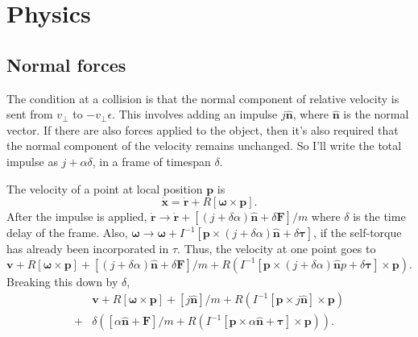 \documentclass[11pt,twocolumn]{article}
\newcommand{\unit}[1]{\hat{\bm {#1}}}
\newcommand{\parens}[1]{\left(#1\right)}
\begin{document}
    \section{Physics}

    \subsection{Normal forces}
    The condition at a collision is that the normal component of relative velocity is sent from $v_\perp$ to $-v_\perp \epsilon$. This involves adding an impulse $j \unit n$, where $\unit n$ is the normal vector. If there are also forces applied to the object, then it's also required that the normal component of the velocity remains unchanged. So I'll write the total impulse as $j + \alpha \delta$, in a frame of timespan $\delta$.

    The velocity of a point at local position $\bm p$ is
    \begin{equation}
      \dot {\bm x} = \dot {\bm r} + R[\bm \omega \times \bm p].
    \end{equation}
    After the impulse is applied, $\dot {\bm r} \rightarrow \dot {\bm r} + [(j + \delta \alpha) \unit n + \delta \bm F]/m$ where $\delta$ is the time delay of the frame. Also, $\bm \omega \rightarrow \bm \omega + I^{-1} [\bm p \times (j + \delta \alpha) \unit n + \delta \bm \tau]$, if the self-torque has already been incorporated in $\tau$. Thus, the velocity at one point goes to
    \begin{equation}
      \bm v + R[\bm \omega \times \bm p] + [(j + \delta \alpha) \unit n + \delta \bm F]/m + R (I^{-1} [\bm p \times (j + \delta \alpha) \unit np + \delta \bm \tau] \times \bm p).
    \end{equation}
    Breaking this down by $\delta$,
    \begin{equation}
      \begin{aligned}
        &\bm v + R[\bm \omega \times \bm p] + [j \unit n]/m + R (I^{-1} [\bm p \times j \unit n] \times \bm p)\\
        +& \delta \parens{[\alpha \unit n + \bm F]/m + R (I^{-1} [\bm p \times \alpha \unit n +  \bm \tau] \times \bm p)}.
      \end{aligned}
    \end{equation}
\end{document}
